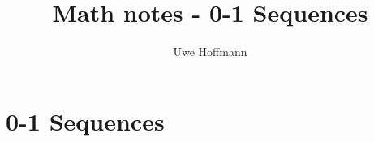 

\title{Math notes - 0-1 Sequences}
\author{Uwe Hoffmann}



\setcounter{chapter}{0}
\chapter{0-1 Sequences}
